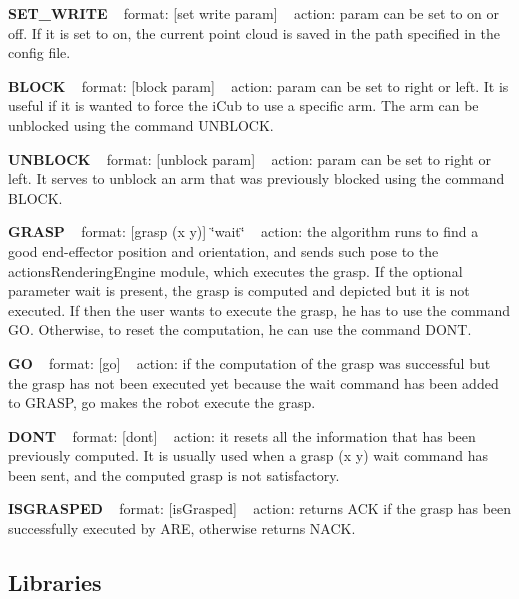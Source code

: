 {\bfseries S\+E\+T\+\_\+\+W\+R\+I\+T\+E} ~\newline
format\+: \mbox{[}set write param\mbox{]} ~\newline
action\+: param can be set to on or off. If it is set to on, the current point cloud is saved in the path specified in the config file.

{\bfseries B\+L\+O\+C\+K} ~\newline
format\+: \mbox{[}block param\mbox{]} ~\newline
action\+: param can be set to right or left. It is useful if it is wanted to force the i\+Cub to use a specific arm. The arm can be unblocked using the command U\+N\+B\+L\+O\+C\+K.

{\bfseries U\+N\+B\+L\+O\+C\+K} ~\newline
format\+: \mbox{[}unblock param\mbox{]} ~\newline
action\+: param can be set to right or left. It serves to unblock an arm that was previously blocked using the command B\+L\+O\+C\+K.

{\bfseries G\+R\+A\+S\+P} ~\newline
format\+: \mbox{[}grasp (x y)\mbox{]} \char`\"{}wait\char`\"{} ~\newline
action\+: the algorithm runs to find a good end-\/effector position and orientation, and sends such pose to the actions\+Rendering\+Engine module, which executes the grasp. If the optional parameter wait is present, the grasp is computed and depicted but it is not executed. If then the user wants to execute the grasp, he has to use the command G\+O. Otherwise, to reset the computation, he can use the command D\+O\+N\+T.

{\bfseries G\+O} ~\newline
format\+: \mbox{[}go\mbox{]} ~\newline
action\+: if the computation of the grasp was successful but the grasp has not been executed yet because the wait command has been added to G\+R\+A\+S\+P, go makes the robot execute the grasp.

{\bfseries D\+O\+N\+T} ~\newline
format\+: \mbox{[}dont\mbox{]} ~\newline
action\+: it resets all the information that has been previously computed. It is usually used when a grasp (x y) wait command has been sent, and the computed grasp is not satisfactory.

{\bfseries I\+S\+G\+R\+A\+S\+P\+E\+D} ~\newline
format\+: \mbox{[}is\+Grasped\mbox{]} ~\newline
action\+: returns A\+C\+K if the grasp has been successfully executed by A\+R\+E, otherwise returns N\+A\+C\+K.\hypertarget{group__handIKModule_lib_sec}{}\subsection{Libraries}\label{group__handIKModule_lib_sec}

